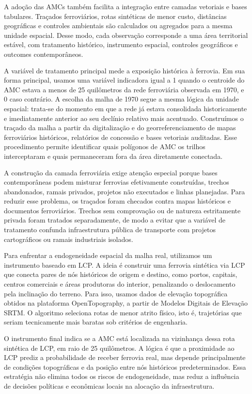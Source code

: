 \documentclass[12pt,a4paper]{article}
\begin{document}
A adoção das AMCs também facilita a integração entre camadas vetoriais e bases tabulares. Traçados ferroviários, rotas sintéticas de menor custo, distâncias geográficas e controles ambientais são calculados ou agregados para a mesma unidade espacial. Desse modo, cada observação corresponde a uma área territorial estável, com tratamento histórico, instrumento espacial, controles geográficos e outcomes contemporâneos.


A variável de tratamento principal mede a exposição histórica à ferrovia. Em sua forma principal, usamos uma variável indicadora igual a 1 quando o centroide do AMC estava a menos de 25 quilômetros da rede ferroviária observada em 1970, e 0 caso contrário. A escolha da malha de 1970 segue a mesma lógica da unidade espacial: trata-se do momento em que a rede já estava consolidada historicamente e imediatamente anterior ao seu declínio relativo mais acentuado. Construímos o traçado da malha a partir da digitalização e do georreferenciamento de mapas ferroviários históricos, relatórios de concessão e bases vetoriais auditadas. Esse procedimento permite identificar quais polígonos de AMC os trilhos interceptaram e quais permaneceram fora da área diretamente conectada.

A construção da camada ferroviária exige atenção especial porque bases contemporâneas podem misturar ferrovias efetivamente construídas, trechos abandonados, ramais privados, projetos não executados e linhas planejadas. Para reduzir esse problema, os traçados foram checados contra mapas históricos e documentos ferroviários. Trechos sem comprovação ou de natureza estritamente privada foram tratados separadamente, de modo a evitar que a variável de tratamento confunda infraestrutura pública de transporte com projetos cartográficos ou ramais industriais isolados.

Para enfrentar a endogeneidade espacial da malha real, utilizamos um instrumento baseado em LCP. A ideia é construir uma ferrovia sintética via LCP que conecta pares de nós históricos de origem e destino, como portos, capitais, centros comerciais e áreas produtoras do interior, penalizando o deslocamento pela inclinação do terreno. Para isso, usamos dados de elevação topográfica obtidos na plataforma OpenTopography, a partir de Modelos Digitais de Elevação SRTM. O algoritmo seleciona rotas de menor atrito físico, isto é, trajetórias que seriam tecnicamente mais baratas sob critérios de engenharia.

O instrumento final indica se a AMC está localizada na vizinhança dessa rota sintética de LCP, em raio de 25 quilômetros. A lógica é que a proximidade ao LCP prediz a probabilidade de receber ferrovia real, mas depende principalmente de condições topográficas e da posição entre nós históricos predeterminados. Essa estratégia não elimina todos os riscos de endogeneidade, mas reduz a influência de decisões políticas e econômicas locais na alocação da infraestrutura.
\end{document}
